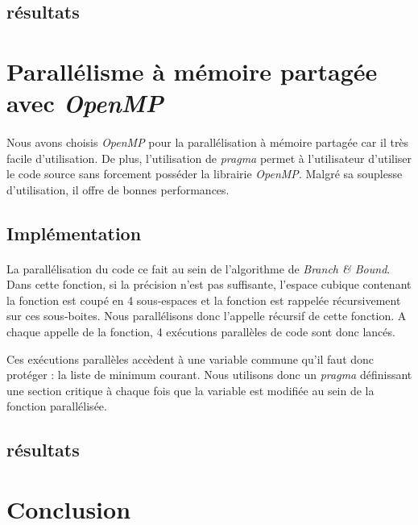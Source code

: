 \documentclass[a4paper]{article}
\begin{document}
    \subsection{résultats}
    \paragraph{}
    
\section{Parallélisme à mémoire partagée avec \emph{OpenMP}}
	\paragraph{}
	Nous avons choisis \emph{OpenMP} pour la parallélisation à mémoire partagée car il très facile d'utilisation. De plus, l'utilisation de \emph{pragma} permet à l'utilisateur d'utiliser le code source sans forcement posséder la librairie \emph{OpenMP}. Malgré sa souplesse d'utilisation, il offre de bonnes performances.
    \subsection{Implémentation}
    \paragraph{}
    La parallélisation du code ce fait au sein de l'algorithme de \emph{Branch \& Bound}. Dans cette fonction, si la précision n'est pas suffisante, l'espace cubique contenant la fonction est coupé en 4 sous-espaces et la fonction est rappelée récursivement sur ces sous-boites. Nous parallélisons donc l'appelle récursif de cette fonction. A chaque appelle de la fonction, 4 exécutions parallèles de code sont donc lancés.
    
    Ces exécutions parallèles accèdent à une variable commune qu'il faut donc protéger : la liste de minimum courant. Nous utilisons donc un \emph{pragma} définissant une section critique à chaque fois que la variable est modifiée au sein de la fonction parallélisée.
    \subsection{résultats}
    \paragraph{}
    
\section{Conclusion}
    \paragraph{}
    
    
\end{document}
